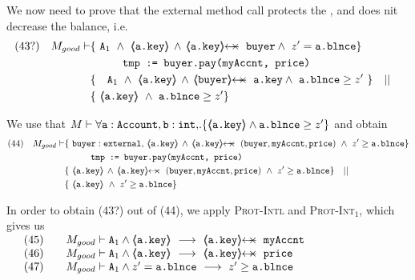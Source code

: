 \begin{proofO}

 

We now need to prove that the external method call  protects the , and does nit decrease the balance, i.e.
\small
\begin{align*}
\text{(43?)} \ \ \ M_{good} \vdash & \{ \ \Alocalsb \   \wedge\    {\inside{\prg{a.key}}} \, \wedge\, \protectedFrom {\prg{a.key}} {\prg{buyer}} \wedge\ z'= \prg{a.\balance}  \} \\
		  		& \SPT  \prg{tmp := buyer.pay(myAccnt, price)}\ \\  
		  		& \{ \ \ \ \Alocalsb \ \wedge\ {\inside{\prg{a.key}}} \, \wedge\, \protectedFrom{\prg{buyer}} {\prg{a.key}} \wedge \ \prg{a.\balance}\geq z'\  \} \ \ \  || \ \ \  \\
		  		&   \{ \   {\inside{\prg{a.key}}}\ \wedge \  \prg{a.\balance}\geq z'  \}
\end{align*}
\normalsize

We use that $M \vdash \forall {\mbox{\normalfont{\texttt{a}}}:\mbox{\normalfont{\texttt{Account}}},\mbox{\normalfont{\texttt{b}}}:\mbox{\normalfont{\texttt{int}}}, }.{{\{}}{\langle\!\!\langle \mbox{\normalfont{\texttt{a.key}}} \rangle\!\!\rangle \wedge \mbox{\normalfont{\texttt{a.\mbox{\normalfont{\texttt{blnce}}}}}}\geq z'}{{\}}}   $
 and  obtain
 \\
 \small
\begin{align*}
\text{(44)} \ \ \ M_{good} \vdash & \{ \ \prg{buyer}:\prg{external},\,  {\inside{\prg{a.key}}} \, \wedge\, 
\protectedFrom {\prg{a.key}} {(\prg{buyer},\prg{myAccnt},\prg{price})} \  \wedge\ z'\geq \prg{a.\balance}  \} \\
		  		& \SPT  \prg{tmp := buyer.pay(myAccnt, price)}\ \\  
		  		& \{ \ \inside{\prg{a.key}} \, \wedge\, 
\protectedFrom {\prg{a.key}} {(\prg{buyer},\prg{myAccnt},\prg{price})}\ \wedge\ z'\geq \prg{a.\balance}  \} \ \ \  || \ \ \  \\
		  		&   \{ \   {\inside{\prg{a.key}}}\  \wedge\ z'\geq \prg{a.\balance}  \}
\end{align*}
\normalsize 
 
In order to obtain (43?) out of (44), we apply \textsc{Prot-Intl} and \textsc{Prot-Int}$_1$,   which gives us\\
$
\begin{array}{llll}
& (45) & & M_{good} \vdash \Alocalsb \wedge  {\inside{\prg{a.key}}}\  \longrightarrow\ \protectedFrom {\prg{a.key}} {\prg{myAccnt}} 
\\
& (46) & & M_{good} \vdash \Alocalsb \wedge  {\inside{\prg{a.key}}}\  \longrightarrow\ \protectedFrom {\prg{a.key}} {\prg{price}} 
\\
& (47) & & M_{good} \vdash \Alocalsb \wedge  z'= \prg{a.\balance}\   \longrightarrow\  z'\geq \prg{a.\balance} 
\end{array}
$


\end{proofO}
